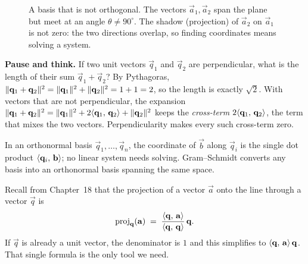 \begin{figure}[htbp]
\centering
{}
\caption{A basis that is not orthogonal. The vectors $\vec{a}_1,\vec{a}_2$ span the plane but meet
at an angle $\theta \neq 90^\circ$. The shadow (projection) of $\vec{a}_2$ on $\vec{a}_1$
is not zero: the two directions overlap, so finding coordinates means
solving a system.}
\label{ch20:crooked}
\end{figure}

\begin{recoverybox}
\textbf{Pause and think.} If two unit vectors $\vec{q}_1$ and $\vec{q}_2$ are
perpendicular, what is the length of their sum $\vec{q}_1+\vec{q}_2$? By Pythagoras,
$\lVert\mathbf{q}_1+\mathbf{q}_2\rVert^2 = \lVert\mathbf{q}_1\rVert^2 + \lVert\mathbf{q}_2\rVert^2 = 1+1=2$, so
the length is exactly $\sqrt{2}$. With vectors that are not perpendicular, the
expansion $\lVert\mathbf{q}_1+\mathbf{q}_2\rVert^2 = \lVert\mathbf{q}_1\rVert^2 + 2\langle \mathbf{q}_1,\, \mathbf{q}_2 \rangle
+ \lVert\mathbf{q}_2\rVert^2$ keeps the \emph{cross-term} $2\langle \mathbf{q}_1,\, \mathbf{q}_2 \rangle$, the
term that mixes the two vectors. Perpendicularity makes every such cross-term zero.
\end{recoverybox}

\begin{intuitionbox}
In an orthonormal basis $\vec{q}_1,\dots,\vec{q}_n$, the coordinate of $\vec{b}$
along $\vec{q}_i$ is the single dot product $\langle \mathbf{q}_i,\, \mathbf{b} \rangle$; no linear
system needs solving. Gram--Schmidt converts any basis into an orthonormal
basis spanning the same space.
\end{intuitionbox}

Recall from Chapter~18 that the projection of a vector $\vec{a}$ onto
the line through a vector $\vec{q}$ is
\[
  \operatorname{proj}_{\mathbf{q}}(\mathbf{a}) \;=\; \frac{\langle \mathbf{q},\, \mathbf{a} \rangle}{\langle \mathbf{q},\, \mathbf{q} \rangle}\,\mathbf{q}.
\]
If $\vec{q}$ is already a unit vector, the denominator is $1$ and this simplifies to
$\langle \mathbf{q},\, \mathbf{a} \rangle\,\mathbf{q}$. That single formula is the only tool we need.

